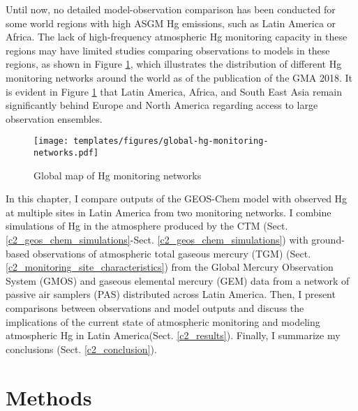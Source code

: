 \begin{flushleft}
Until now, no detailed model-observation comparison has been conducted for some world regions with high ASGM Hg emissions, such as Latin America or Africa. The lack of high-frequency atmospheric Hg monitoring capacity in these regions may have limited studies comparing observations to models in these regions, as shown in Figure \ref{fig:global-hg-monitoring-networks}, which illustrates the distribution of different Hg monitoring networks around the world as of the publication of the GMA 2018. It is evident in Figure \ref{fig:global-hg-monitoring-networks} that Latin America, Africa, and South East Asia remain significantly behind Europe and North America regarding access to large observation ensembles. 
\end{flushleft}

\begin{figure}[H]
  \texttt{[image: templates/figures/global-hg-monitoring-networks.pdf]}
  \caption{Global map of Hg monitoring networks \cite{united_nations_environment_programme_technical_2019}}
  \label{fig:global-hg-monitoring-networks}
  \centering
  
\end{figure}
\FloatBarrier

\begin{flushleft}
 In this chapter, I compare outputs of the GEOS-Chem model with observed Hg at multiple sites in Latin America from two monitoring networks. I combine simulations of Hg in the atmosphere produced by the \gc CTM (Sect. \ref{c2_geos_chem_simulations}-Sect. \ref{c2_geos_chem_simulations}) with ground-based observations of atmospheric total gaseous mercury (TGM) (Sect. \ref{c2_monitoring_site_characteristics}) from the Global Mercury Observation System (GMOS)\cite{sprovieri_atmospheric_2016} and gaseous elemental mercury (GEM) data from a network of passive air samplers (PAS) distributed across Latin America. Then, I present comparisons between observations and model outputs and discuss the implications of the current state of atmospheric monitoring and modeling atmospheric Hg in Latin America(Sect. \ref{c2_results}). Finally, I summarize my conclusions (Sect. \ref{c2_conclusion}).
\end{flushleft}




\section{Methods}\label{c2_methods}
